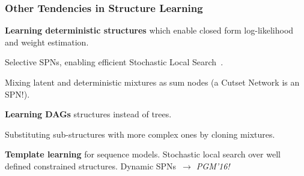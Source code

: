 \documentclass[10pt, t, xcolor={usenames,dvipsnames,svgnames}, compress]{beamer}
\begin{document}
\begin{frame}
  \frametitle{Other Tendencies in Structure Learning}
  \textbf{Learning deterministic structures} which enable closed form
  log-likelihood and weight estimation.\par
  Selective SPNs, enabling efficient Stochastic Local
  Search~\parencite{Peharz2014b}.\par
  Mixing latent and deterministic mixtures as sum
  nodes (a Cutset Network is an
  SPN!).~\parencite{Rahman2016}\par\bigskip
  
  \textbf{Learning DAGs} structures instead of trees.\par
  Substituting sub-structures with more complex ones by cloning mixtures.~\parencite{Dennis2015}\par\bigskip
  
  \textbf{Template learning} for sequence
  models.
  Stochastic local search over well defined constrained structures.
  Dynamic SPNs~\parencite{Melibari2016c}\emph{$\rightarrow$ PGM'16!}\par\bigskip
\end{frame}
\end{document}
